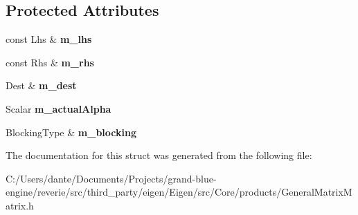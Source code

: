 \subsection*{Protected Attributes}
\begin{DoxyCompactItemize}
\item 
\mbox{\label{struct_eigen_1_1internal_1_1gemm__functor_ac6f8ffeaafe2b77482fb2823b873229a}} 
const Lhs \& {\bfseries m\+\_\+lhs}
\item 
\mbox{\label{struct_eigen_1_1internal_1_1gemm__functor_a1dbea6badf09fbba36dc310601e31a77}} 
const Rhs \& {\bfseries m\+\_\+rhs}
\item 
\mbox{\label{struct_eigen_1_1internal_1_1gemm__functor_a0a5d7ecf3c8912fd58586b29f8649def}} 
Dest \& {\bfseries m\+\_\+dest}
\item 
\mbox{\label{struct_eigen_1_1internal_1_1gemm__functor_a7403054b4de857243937730e8bc02576}} 
Scalar {\bfseries m\+\_\+actual\+Alpha}
\item 
\mbox{\label{struct_eigen_1_1internal_1_1gemm__functor_aa5708efe545c969cfea4637c575e2e46}} 
Blocking\+Type \& {\bfseries m\+\_\+blocking}
\end{DoxyCompactItemize}


The documentation for this struct was generated from the following file\+:\begin{DoxyCompactItemize}
\item 
C\+:/\+Users/dante/\+Documents/\+Projects/grand-\/blue-\/engine/reverie/src/third\+\_\+party/eigen/\+Eigen/src/\+Core/products/General\+Matrix\+Matrix.\+h\end{DoxyCompactItemize}
